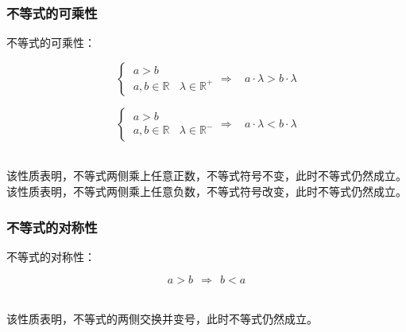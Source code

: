 \documentclass[UTF8]{ctexart}
\begin{document}
\subsubsection{不等式的可乘性}
    不等式的可乘性：\vspace{5pt}
    \begin{large}
        \begin{equation*}
            \begin{cases}
                ~a>b\\[2mm]
                ~a,b\in\mathbb{R}~~~~\lambda\in\mathbb{R^+}
            \end{cases}
            \Rightarrow~~~~a\cdot\lambda>b\cdot\lambda
        \end{equation*}
    \end{large}\vspace{3pt}
    \begin{large}
        \begin{equation*}
            \begin{cases}
                ~a>b\\[2mm]
                ~a,b\in\mathbb{R}~~~~\lambda\in\mathbb{R^-}
            \end{cases}
            \Rightarrow~~~~a\cdot\lambda<b\cdot\lambda
        \end{equation*}
    \end{large}\\[1mm]
    该性质表明，不等式两侧乘上任意正数，不等式符号不变，此时不等式仍然成立。\\[3mm]
    该性质表明，不等式两侧乘上任意负数，不等式符号改变，此时不等式仍然成立。

\newpage

\subsubsection{不等式的对称性}
    不等式的对称性：\vspace{5pt}
    \begin{large}
        \begin{equation*}
            a>b~~\Rightarrow~~b<a
        \end{equation*}
    \end{large}\\
    该性质表明，不等式的两侧交换并变号，此时不等式仍然成立。\\
\end{document}
